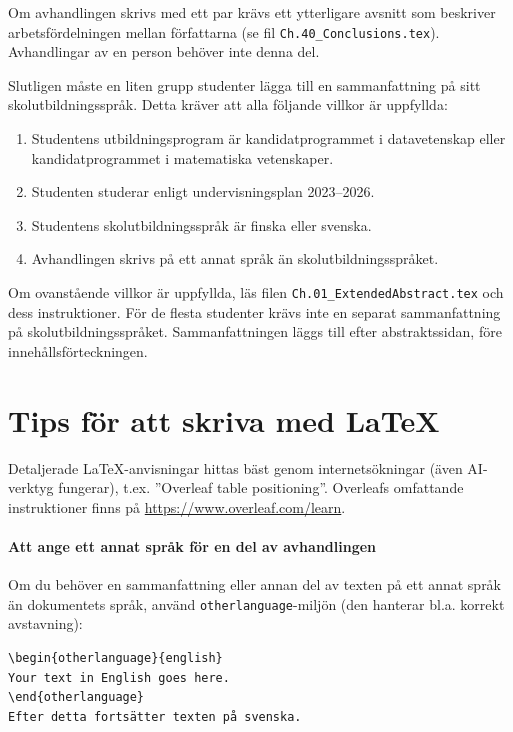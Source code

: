 \documentclass[swedish, manual, a4paper]{csthesis}
\begin{document}
Om avhandlingen skrivs med ett par krävs ett ytterligare avsnitt som beskriver arbetsfördelningen mellan författarna (se fil \texttt{Ch.40\_Conclusions.tex}). Avhandlingar av en person behöver inte denna del.

Slutligen måste en liten grupp studenter lägga till en sammanfattning på sitt skolutbildningsspråk. Detta kräver att alla följande villkor är uppfyllda:
\begin{enumerate}
\item Studentens utbildningsprogram är kandidatprogrammet i datavetenskap eller kandidatprogrammet i matematiska vetenskaper.
\item Studenten studerar enligt undervisningsplan 2023--2026.
\item Studentens skolutbildningsspråk är finska eller svenska.
\item Avhandlingen skrivs på ett annat språk än skolutbildningsspråket.
\end{enumerate}
Om ovanstående villkor är uppfyllda, läs filen \texttt{Ch.01\_ExtendedAbstract.tex} och dess instruktioner. För de flesta studenter krävs inte en separat sammanfattning på skolutbildningsspråket. Sammanfattningen läggs till efter abstraktssidan, före innehållsförteckningen.


\section{Tips för att skriva med \LaTeX}\label{app:latex-tips}

Detaljerade \LaTeX-anvisningar hittas bäst genom internetsökningar (även AI-verktyg fungerar), t.ex. ”Overleaf table positioning”. Overleafs omfattande instruktioner finns på \url{https://www.overleaf.com/learn}.

\paragraph{Att ange ett annat språk för en del av avhandlingen}
Om du behöver en sammanfattning eller annan del av texten på ett annat språk än dokumentets språk, använd \texttt{otherlanguage}-miljön (den hanterar bl.a. korrekt avstavning):

\begin{verbatim}
\begin{otherlanguage}{english} 
Your text in English goes here. 
\end{otherlanguage}
Efter detta fortsätter texten på svenska.
\end{verbatim}
\end{document}
